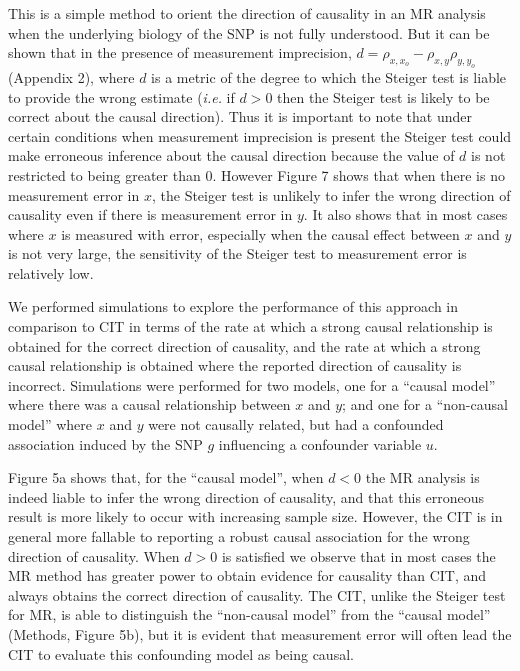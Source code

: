 \documentclass[]{article}
\begin{document}
This is a simple method to orient the direction of causality in an MR
analysis when the underlying biology of the SNP is not fully understood.
But it can be shown that in the presence of measurement imprecision,
\(d = \rho_{x, x_o} - \rho_{x,y}\rho_{y,y_o}\) (Appendix 2), where \(d\)
is a metric of the degree to which the Steiger test is liable to provide
the wrong estimate (\emph{i.e.} if \(d>0\) then the Steiger test is
likely to be correct about the causal direction). Thus it is important
to note that under certain conditions when measurement imprecision is
present the Steiger test could make erroneous inference about the causal
direction because the value of \(d\) is not restricted to being greater
than 0. However Figure 7 shows that when there is no measurement error
in \(x\), the Steiger test is unlikely to infer the wrong direction of
causality even if there is measurement error in \(y\). It also shows
that in most cases where \(x\) is measured with error, especially when
the causal effect between \(x\) and \(y\) is not very large, the
sensitivity of the Steiger test to measurement error is relatively low.

We performed simulations to explore the performance of this approach in
comparison to CIT in terms of the rate at which a strong causal
relationship is obtained for the correct direction of causality, and the
rate at which a strong causal relationship is obtained where the
reported direction of causality is incorrect. Simulations were performed
for two models, one for a ``causal model'' where there was a causal
relationship between \(x\) and \(y\); and one for a ``non-causal model''
where \(x\) and \(y\) were not causally related, but had a confounded
association induced by the SNP \(g\) influencing a confounder variable
\(u\).

Figure 5a shows that, for the ``causal model'', when \(d < 0\) the MR
analysis is indeed liable to infer the wrong direction of causality, and
that this erroneous result is more likely to occur with increasing
sample size. However, the CIT is in general more fallable to reporting a
robust causal association for the wrong direction of causality. When
\(d > 0\) is satisfied we observe that in most cases the MR method has
greater power to obtain evidence for causality than CIT, and always
obtains the correct direction of causality. The CIT, unlike the Steiger
test for MR, is able to distinguish the ``non-causal model'' from the
``causal model'' (Methods, Figure 5b), but it is evident that
measurement error will often lead the CIT to evaluate this confounding
model as being causal.
\end{document}
